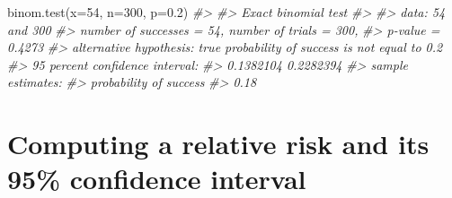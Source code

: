 \documentclass[
]{memoir}
\newenvironment{Shaded}{\begin{snugshade}}{\end{snugshade}}
\newcommand{\AttributeTok}[1]{\textcolor[rgb]{0.77,0.63,0.00}{#1}}
\newcommand{\CommentTok}[1]{\textcolor[rgb]{0.56,0.35,0.01}{\textit{#1}}}
\newcommand{\DecValTok}[1]{\textcolor[rgb]{0.00,0.00,0.81}{#1}}
\newcommand{\FloatTok}[1]{\textcolor[rgb]{0.00,0.00,0.81}{#1}}
\newcommand{\FunctionTok}[1]{\textcolor[rgb]{0.00,0.00,0.00}{#1}}
\newcommand{\NormalTok}[1]{#1}
\begin{document}
\begin{Shaded}
\begin{Highlighting}[]
\FunctionTok{binom.test}\NormalTok{(}\AttributeTok{x=}\DecValTok{54}\NormalTok{, }\AttributeTok{n=}\DecValTok{300}\NormalTok{, }\AttributeTok{p=}\FloatTok{0.2}\NormalTok{)}
\CommentTok{\#\textgreater{} }
\CommentTok{\#\textgreater{}  Exact binomial test}
\CommentTok{\#\textgreater{} }
\CommentTok{\#\textgreater{} data:  54 and 300}
\CommentTok{\#\textgreater{} number of successes = 54, number of trials = 300,}
\CommentTok{\#\textgreater{} p{-}value = 0.4273}
\CommentTok{\#\textgreater{} alternative hypothesis: true probability of success is not equal to 0.2}
\CommentTok{\#\textgreater{} 95 percent confidence interval:}
\CommentTok{\#\textgreater{}  0.1382104 0.2282394}
\CommentTok{\#\textgreater{} sample estimates:}
\CommentTok{\#\textgreater{} probability of success }
\CommentTok{\#\textgreater{}                   0.18}
\end{Highlighting}
\end{Shaded}

\hypertarget{computing-a-relative-risk-and-its-95-confidence-interval}{%
\section{Computing a relative risk and its 95\% confidence interval}\label{computing-a-relative-risk-and-its-95-confidence-interval}}
\end{document}
